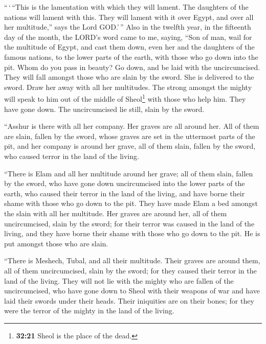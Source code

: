  ``\,`\,``This is the lamentation with which they will
lament. The daughters of the nations will lament with this. They will
lament with it over Egypt, and over all her multitude,'' says the Lord
GOD.'\,''  Also in the twelfth year, in the fifteenth day
of the month, the LORD's word came to me, saying,  ``Son
of man, wail for the multitude of Egypt, and cast them down, even her
and the daughters of the famous nations, to the lower parts of the
earth, with those who go down into the pit.  Whom do you
pass in beauty? Go down, and be laid with the uncircumcised.
 They will fall amongst those who are slain by the sword.
She is delivered to the sword. Draw her away with all her multitudes.
 The strong amongst the mighty will speak to him out of
the middle of Sheol\footnote{\textbf{32:21} Sheol is the place of the
  dead.} with those who help him. They have gone down. The uncircumcised
lie still, slain by the sword.

 ``Asshur is there with all her company. Her graves are
all around her. All of them are slain, fallen by the sword,
 whose graves are set in the uttermost parts of the pit,
and her company is around her grave, all of them slain, fallen by the
sword, who caused terror in the land of the living.

 ``There is Elam and all her multitude around her grave;
all of them slain, fallen by the sword, who have gone down uncircumcised
into the lower parts of the earth, who caused their terror in the land
of the living, and have borne their shame with those who go down to the
pit.  They have made Elam a bed amongst the slain with
all her multitude. Her graves are around her, all of them uncircumcised,
slain by the sword; for their terror was caused in the land of the
living, and they have borne their shame with those who go down to the
pit. He is put amongst those who are slain.

 ``There is Meshech, Tubal, and all their multitude.
Their graves are around them, all of them uncircumcised, slain by the
sword; for they caused their terror in the land of the living.
 They will not lie with the mighty who are fallen of the
uncircumcised, who have gone down to Sheol with their weapons of war and
have laid their swords under their heads. Their iniquities are on their
bones; for they were the terror of the mighty in the land of the living.

